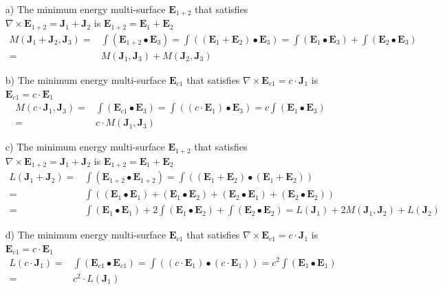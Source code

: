 \begin{itemize}
\item[a)]
The minimum energy multi-surface \(\mathbf{E}_{1+2}\) that satisfies \(\nabla \times \mathbf{E}_{1+2} = \mathbf{J}_1 + \mathbf{J}_2\) is \(\mathbf{E}_{1+2} = \mathbf{E}_1 + \mathbf{E}_2\)
\begin{align*}
M(\mathbf{J}_1 + \mathbf{J}_2, \mathbf{J}_3) = & \int (\mathbf{E}_{1+2} \bullet \mathbf{E}_3) = \int ((\mathbf{E}_1 + \mathbf{E}_2) \bullet \mathbf{E}_3) = \int (\mathbf{E}_1 \bullet \mathbf{E}_3) + \int (\mathbf{E}_2 \bullet \mathbf{E}_3) \\
= & M(\mathbf{J}_1, \mathbf{J}_3) + M(\mathbf{J}_2, \mathbf{J}_3)
\end{align*} 
\item[b)]
The minimum energy multi-surface \(\mathbf{E}_{c1}\) that satisfies \(\nabla \times \mathbf{E}_{c1} = c \cdot \mathbf{J}_1\) is \(\mathbf{E}_{c1} = c \cdot \mathbf{E}_1\)
\begin{align*}
M(c \cdot \mathbf{J}_1, \mathbf{J}_3) = & \int (\mathbf{E}_{c1} \bullet \mathbf{E}_3) = \int ((c \cdot \mathbf{E}_1) \bullet \mathbf{E}_3) = c\int (\mathbf{E}_1 \bullet \mathbf{E}_3) \\
= & c \cdot M(\mathbf{J}_1, \mathbf{J}_3)
\end{align*} 
\item[c)]
The minimum energy multi-surface \(\mathbf{E}_{1+2}\) that satisfies \(\nabla \times \mathbf{E}_{1+2} = \mathbf{J}_1 + \mathbf{J}_2\) is \(\mathbf{E}_{1+2} = \mathbf{E}_1 + \mathbf{E}_2\)
\begin{align*}
L(\mathbf{J}_1 + \mathbf{J}_2) = & \int (\mathbf{E}_{1+2} \bullet \mathbf{E}_{1+2}) = \int ((\mathbf{E}_1 + \mathbf{E}_2) \bullet (\mathbf{E}_1 + \mathbf{E}_2)) \\
= & \int ((\mathbf{E}_1 \bullet \mathbf{E}_1) + (\mathbf{E}_1 \bullet \mathbf{E}_2) + (\mathbf{E}_2 \bullet \mathbf{E}_1) + (\mathbf{E}_2 \bullet \mathbf{E}_2)) \\
= & \int (\mathbf{E}_1 \bullet \mathbf{E}_1) + 2 \int (\mathbf{E}_1 \bullet \mathbf{E}_2) + \int (\mathbf{E}_2 \bullet \mathbf{E}_2) 
= L(\mathbf{J}_1) + 2M(\mathbf{J}_1, \mathbf{J}_2) + L(\mathbf{J}_2)
\end{align*}
\item[d)]
The minimum energy multi-surface \(\mathbf{E}_{c1}\) that satisfies \(\nabla \times \mathbf{E}_{c1} = c \cdot \mathbf{J}_1\) is \(\mathbf{E}_{c1} = c \cdot \mathbf{E}_1\)
\begin{align*}
L(c \cdot \mathbf{J}_1) = & \int (\mathbf{E}_{c1} \bullet \mathbf{E}_{c1}) = \int ((c \cdot \mathbf{E}_1) \bullet (c \cdot \mathbf{E}_1)) = c^2\int (\mathbf{E}_1 \bullet \mathbf{E}_1) \\
= & c^2 \cdot L(\mathbf{J}_1)
\end{align*} 
\end{itemize}   



